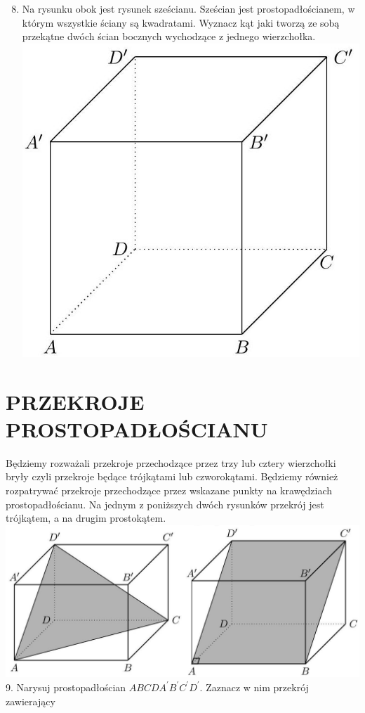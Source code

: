 \documentclass[10pt]{article}
\begin{document}
\begin{enumerate}
  \setcounter{enumi}{7}
  \item Na rysunku obok jest rysunek sześcianu. Sześcian jest prostopadłościanem, w którym wszystkie ściany są kwadratami. Wyznacz kąt jaki tworzą ze sobą przekątne dwóch ścian bocznych wychodzące z jednego wierzchołka.\\
\includegraphics[max width=\textwidth, center]{2024_11_21_e9b4faa005d5be2cc318g-074}
\end{enumerate}

\section*{PRZEKROJE PROSTOPADŁOŚCIANU}
Będziemy rozważali przekroje przechodzące przez trzy lub cztery wierzchołki bryły czyli przekroje będące trójkątami lub czworokątami. Będziemy również rozpatrywać przekroje przechodzące przez wskazane punkty na krawędziach prostopadłościanu. Na jednym z poniższych dwóch rysunków przekrój jest trójkątem, a na drugim prostokątem.\\
\includegraphics[max width=\textwidth, center]{2024_11_21_e9b4faa005d5be2cc318g-074(1)}\\
9. Narysuj prostopadłościan \(A B C D A^{\prime} B^{\prime} C^{\prime} D^{\prime}\). Zaznacz w nim przekrój zawierający
\end{document}
